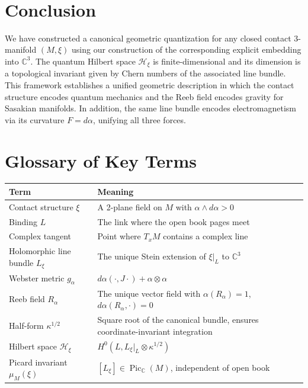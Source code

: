 \documentclass[12pt]{article}
\newcommand{\C}{\mathbb{C}}
\newcommand{\Hilb}{\mathcal{H}}
\newcommand{\Pic}{\operatorname{Pic}}
\begin{document}
\par
\par\

\section{Conclusion}
We have constructed a canonical geometric quantization for any closed contact 3-manifold $(M,\xi)$ using our  construction of the corresponding explicit embedding into $\C^3$. The quantum Hilbert space $\Hilb_\xi$ is finite-dimensional and its dimension is a topological invariant given by Chern numbers of the associated line bundle. This framework establishes a unified geometric description in which the contact structure encodes quantum mechanics and the Reeb field encodes gravity for Sasakian manifolds. In addition, the same line bundle encodes electromagnetism via its curvature $F = d\alpha$, unifying all three forces. 

\appendix

\newpage 
\section{Glossary of Key Terms}

\begin{tabular}{|l|p{10cm}|}
\hline
\textbf{Term} & \textbf{Meaning} \\
\hline
Contact structure $\xi$ & A 2-plane field on $M$ with $\alpha \wedge d\alpha > 0$ \\
Binding $L$ & The link where the open book pages meet \\
Complex tangent & Point where $T_xM$ contains a complex line \\
Holomorphic line bundle $L_\xi$ & The unique Stein extension of $\xi|_L$ to $\C^3$ \\
Webster metric $g_\alpha$ & $d\alpha(\cdot, J\cdot) + \alpha \otimes \alpha$ \\
Reeb field $R_\alpha$ & The unique vector field with $\alpha(R_\alpha)=1$, $d\alpha(R_\alpha,\cdot)=0$ \\
Half-form $\kappa^{1/2}$ & Square root of the canonical bundle, ensures coordinate-invariant integration \\
Hilbert space $\Hilb_\xi$ & $H^0(L, L_\xi|_L \otimes \kappa^{1/2})$ \\
Picard invariant $\mu_M(\xi)$ & $[L_\xi] \in \Pic_\C(M)$, independent of open book \\
\hline
\end{tabular}
\end{document}
